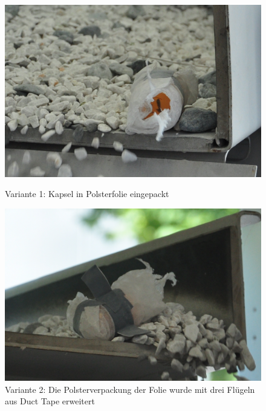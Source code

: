 \begin{figure}[htb]
	\centering
	\begin{minipage}[t]{0.49\linewidth}
		\centering
		\includegraphics[width=1\linewidth]{images/k4-polsterfolie.JPG}
		\caption{Variante 1: Kapsel in Polsterfolie eingepackt}
		\label{fig:k4_polsterfolie}
	\end{minipage}%
	\hfill
	\begin{minipage}[t]{0.49\linewidth}
		\centering
		\includegraphics[width=\linewidth]{images/k4-fluegel.JPG}
		\caption{Variante 2: Die Polsterverpackung der Folie wurde mit drei Flügeln aus Duct Tape erweitert}
		\label{fig:k4_fluegel}
	\end{minipage}
\end{figure}

